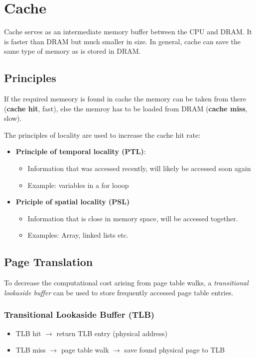 \section{Cache}
Cache serves as an intermediate memory buffer between the CPU and DRAM. It is faster than DRAM but much smaller in size.
In general, cache can save the same type of memory as is stored in DRAM.
\subsection{Principles}

If the required memeory is found in cache the memory can be taken from there (\textbf{cache hit}, fast), else the memroy has to be loaded from DRAM (\textbf{cache miss}, slow).

\newpar{}

The principles of locality are used to increase the cache hit rate:
\begin{itemize}
    \item \textbf{Principle of temporal locality (PTL)}:
          \begin{itemize}
              \item Information that was accessed recently, will likely be accessed soon again
              \item Example: variables in a for looop
          \end{itemize}
    \item \textbf{Priciple of spatial locality (PSL)}
          \begin{itemize}
              \item Information that is close in memory space, will be accessed together.
              \item Examples: Array, linked lists etc.\
          \end{itemize}
\end{itemize}

\subsection{Page Translation}
To decrease the computational cost arising from page table walks, a \textit{transitional lookaside buffer} can be used to store frequently accessed page table entries.

\subsubsection{Transitional Lookaside Buffer (TLB)}
\begin{itemize}
    \item TLB hit $\to$ return TLB entry (physical address)
    \item TLB miss $\to$ page table walk $\to$ save found physical page to TLB
\end{itemize}

